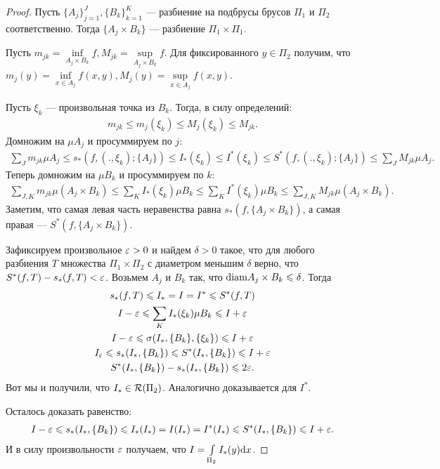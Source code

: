 \begin{proof}

Пусть $\{ A_j \}_{j=1}^{J}, \{ B_k \}_{k=1}^K$ --- разбиение на подбрусы брусов $\Pi_1$ и $\Pi_2$ соответственно. Тогда $\{ A_j \times B_k\}$ --- разбиение $\Pi_1 \times \Pi_1$.

Пусть $m_{jk} = \inf\limits_{A_j \times B_k} f, M_{jk} = \sup\limits_{A_j \times B_k} f$. Для фиксированного $y \in \Pi_2$ получим, что $m_j(y) = \inf\limits_{x \in A_j} f(x, y), M_j(y) = \sup\limits_{x \in A_j} f(x, y)$.

Пусть $\xi_k$ --- произвольная точка из $B_k$. Тогда, в силу определений:
\begin{gather*}
m_{jk} \leq m_j(\xi_k) \leq M_j(\xi_k) \leq M_{jk}. 
\end{gather*}
Домножим на $\mu A_j$ и просуммируем по $j$:
\begin{gather*}
\sum_J m_{jk} \mu A_j \leq s_*(f, (., \xi_k); \{A_j \}) \leq I_*(\xi_k) \leq I^*(\xi_k) \leq S^*(f, (., \xi_k); \{A_j \}) \leq \sum_J M_{jk} \mu A_j.
\end{gather*}
Теперь домножим на $\mu B_k$ и просуммируем по $k$:
\begin{gather*}
\sum_{J, K} m_{jk} \mu(A_j \times B_k) \leq \sum_K I_*(\xi_k)\mu B_k \leq \sum_K I^*(\xi_k) \mu B_k \leq \sum_{J, K} M_{jk} \mu(A_j \times B_k).
\end{gather*}
Заметим, что самая левая часть неравенства равна $s_*(f, \{A_j \times B_k \})$, а самая правая --- $S^*(f, \{A_j \times B_k \})$.

Зафиксируем произвольное $\varepsilon > 0$ и найдем $\delta > 0$ такое, что для любого разбиения $T$ множества $\Pi_1 \times \Pi_2$ с диаметром меньшим $\delta$ верно, что $S^*(f, T) - s_*(f, T) < \varepsilon$. Возьмем $A_j$ и $B_k$ так, что $\mathrm{diam} A_j \times B_k \leqslant \delta$. Тогда
\begin{gather*}
s_*(f, T) \leqslant I_* = I = I^* \leqslant S^*(f, T) \\
I - \varepsilon \leqslant \sum_K I_*(\xi_k) \mu B_k \leqslant I+\varepsilon \\
I - \varepsilon \leqslant \sigma(I_*, \{ B_k \}, \{\xi_k \}) \leqslant I+\varepsilon \\
I_\varepsilon \leqslant s_*(I_*, \{B_k\}) \leqslant S^*(I_*, \{B_k\}) \leqslant I +\varepsilon \\
S^*(I_*, \{B_k\}) - s_*(I_*, \{B_k\}) \leqslant 2\varepsilon.
\end{gather*}
Вот мы и получили, что $I_* \in \mathcal{R}(\Pi_2)$. Аналогично доказывается для $I^*$.

Осталось доказать равенство:
\begin{gather}
I - \varepsilon \leqslant s_*(I_*, \{B_k\}) \leqslant I_*(I_*) = I(I_*) = I^*(I_*) \leqslant  S^*(I_*, \{B_k\}) \leqslant I+\varepsilon.
\end{gather}
И в силу произвольности $\varepsilon$ получаем, что $I = \int\limits_{\Pi_2} I_*(y)\mathrm{d}x$.
\end{proof}


